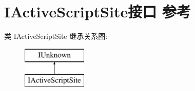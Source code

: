 \hypertarget{interface_i_active_script_site}{}\section{I\+Active\+Script\+Site接口 参考}
\label{interface_i_active_script_site}
类 I\+Active\+Script\+Site 继承关系图\+:\begin{figure}[H]
\begin{center}
\leavevmode
\includegraphics[height=2.000000cm]{interface_i_active_script_site}
\end{center}
\end{figure}
